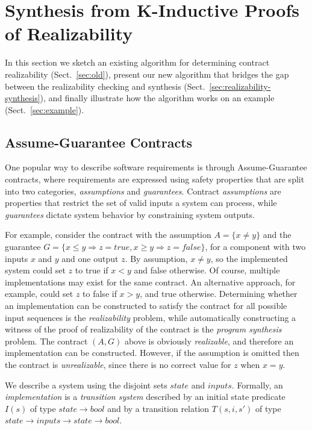 \section{Synthesis from K-Inductive Proofs of Realizability}
\label{sec:kinductionsynth}
In this section we %
 sketch an existing algorithm for determining contract realizability
(Sect.~\ref{sec:old}), present our new algorithm that bridges the gap between the realizability checking and synthesis (Sect.~\ref{sec:realizability-synthesis}),
and finally illustrate how the algorithm works on an example
(Sect.~\ref{sec:example}).

\iffalse
\subsection{Assume-Guarantee Contracts}
\label{sec:pre}

One popular way to describe software requirements is through Assume-Guarantee
contracts, where requirements are expressed using safety properties that are
split into two categories, \emph{assumptions} and \emph{guarantees}.
Contract \emph{assumptions} are properties that restrict the set of valid inputs
a system can process, while \emph{guarantees} dictate system behavior by constraining system outputs.

For example, consider the contract with the assumption $A = \{x\neq
y\}$ and the guarantee $G = \{x \leq y \Longrightarrow z =
\textit{true}, x \geq y \Longrightarrow z = \textit{false}\}$, for a component with two inputs $x$ and $y$ and one output $z$.  By assumption, $x \neq y$, so the implemented system could set $z$ to true if $x < y$ and false otherwise. Of course, multiple implementations may exist for the same contract. An
alternative approach, for example, could set $z$ to false if $x > y$, and true
otherwise. Determining whether an implementation can be constructed to satisfy
the contract for all possible input sequences is the \emph{realizability} problem, while automatically constructing a witness of the proof of realizability of the contract is the \emph{program synthesis} problem.  The contract $(A,G)$ above is obviously \emph{realizable}, and therefore an implementation can be constructed.
However, if the assumption is omitted then the contract is \emph{unrealizable}, since there is no correct value for $z$ when $x=y$.

We describe a system using the disjoint sets $state$ and $inputs$.
Formally, an \emph{implementation} is a \emph{transition system}
described by an initial state predicate $I(s)$ of type $state \to
bool$ and by a transition relation $T(s,i,s')$ of type $state \to
inputs \to state \to bool$.

